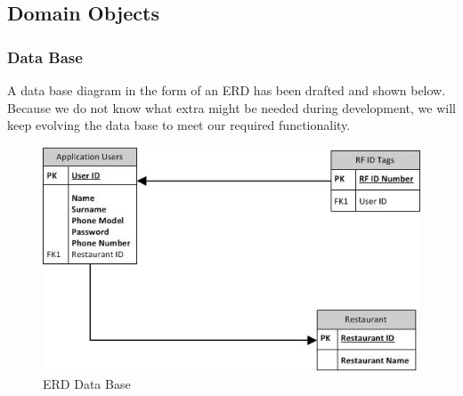 \documentclass[11pt,titlepage]{article} %
\begin{document}

\subsection{Domain Objects}

\subsubsection{Data Base}
A data base diagram in the form of an ERD has been drafted and shown below. Because we do not know what extra might be needed during development, we will keep evolving the data base to meet our required functionality. 

\begin{figure}[H]
\centering
\includegraphics[scale=1]{ERDKinderFinderDatabase.jpg} 
\caption{ERD Data Base}
\end{figure}


\newpage













\end{document}

